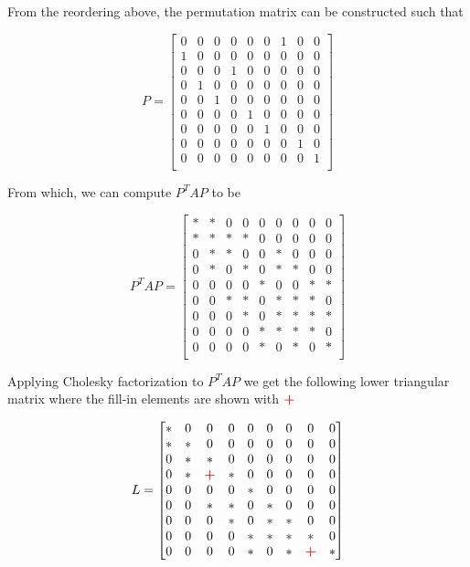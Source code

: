\noindent
From the reordering above, the permutation matrix can be constructed such that 

$$
P = 
\begin{bmatrix}
0 & 0 & 0 & 0 & 0 & 0 & 1 & 0 & 0\\
1 & 0 & 0 & 0 & 0 & 0 & 0 & 0 & 0\\
0 & 0 & 0 & 1 & 0 & 0 & 0 & 0 & 0\\
0 & 1 & 0 & 0 & 0 & 0 & 0 & 0 & 0\\
0 & 0 & 1 & 0 & 0 & 0 & 0 & 0 & 0\\
0 & 0 & 0 & 0 & 1 & 0 & 0 & 0 & 0\\
0 & 0 & 0 & 0 & 0 & 1 & 0 & 0 & 0\\
0 & 0 & 0 & 0 & 0 & 0 & 0 & 1 & 0\\
0 & 0 & 0 & 0 & 0 & 0 & 0 & 0 & 1\\
\end{bmatrix}
$$

\noindent
From which, we can compute $P^{T}AP$ to be

$$
P^{T}AP = 
\begin{bmatrix}
* & * & 0 & 0 & 0 & 0 & 0 & 0 & 0 \\
* & * & * & * & 0 & 0 & 0 & 0 & 0 \\
0 & * & * & 0 & 0 & * & 0 & 0 & 0 \\
0 & * & 0 & * & 0 & * & * & 0 & 0 \\
0 & 0 & 0 & 0 & * & 0 & 0 & * & * \\
0 & 0 & * & * & 0 & * & * & * & 0 \\
0 & 0 & 0 & * & 0 & * & * & * & * \\
0 & 0 & 0 & 0 & * & * & * & * & 0 \\
0 & 0 & 0 & 0 & * & 0 & * & 0 & * \\
\end{bmatrix}
$$

\noindent
Applying Cholesky factorization to $P^{T}AP$ we get the following lower triangular matrix where the fill-in elements are shown with $\color{red}{\textbf{+}}$

$$
L = 
\begin{bmatrix}
* & 0 & 0 & 0 & 0 & 0 & 0 & 0 & 0 \\
* & * & 0 & 0 & 0 & 0 & 0 & 0 & 0 \\
0 & * & * & 0 & 0 & 0 & 0 & 0 & 0 \\
0 & * & \color{red}{\textbf{+}} & * & 0 & 0 & 0 & 0 & 0 \\
0 & 0 & 0 & 0 & * & 0 & 0 & 0 & 0 \\
0 & 0 & * & * & 0 & * & 0 & 0 & 0 \\
0 & 0 & 0 & * & 0 & * & * & 0 & 0 \\
0 & 0 & 0 & 0 & * & * & * & * & 0 \\
0 & 0 & 0 & 0 & * & 0 & * & \color{red}{\textbf{+}} & * \\
\end{bmatrix}
$$
